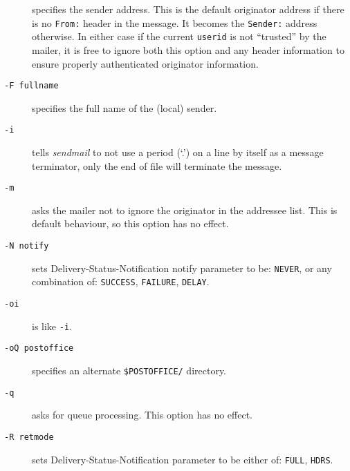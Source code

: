 \begin{description}
specifies the sender address. This is the default 
originator address if there is no {\tt From:} header in the message. 
It becomes the {\tt Sender:} address otherwise. In either case if the 
current {\tt userid} is not ``trusted'' by the mailer, it is free to 
ignore both this option and any header information to ensure properly 
authenticated originator information.



\item[ {\tt -F fullname}] \mbox{}

specifies the full name of the (local) sender.



\item[ {\tt -i}] \mbox{}

tells {\em sendmail\/} to not use a period (`.') on a line 
by itself as a message terminator, only the end of file will terminate the message.



\item[ {\tt -m}] \mbox{}

asks the mailer not to ignore the originator in the 
addressee list. This is default behaviour, so this option has no effect.



\item[ {\tt -N notify}] \mbox{}

sets Delivery-Status-Notification notify parameter 
to be: {\tt NEVER}, or any combination of: {\tt SUCCESS}, 
{\tt FAILURE}, {\tt DELAY}.



\item[ {\tt -oi}] \mbox{}

is like {\tt -i}.



\item[ {\tt -oQ postoffice}] \mbox{}

specifies an alternate {\tt \$POSTOFFICE/} 
directory.



\item[ {\tt -q}] \mbox{}

asks for queue processing. This option has no effect.



\item[ {\tt -R retmode}] \mbox{}

sets Delivery-Status-Notification parameter to be 
either of: {\tt FULL}, {\tt HDRS}.




\end{description}

